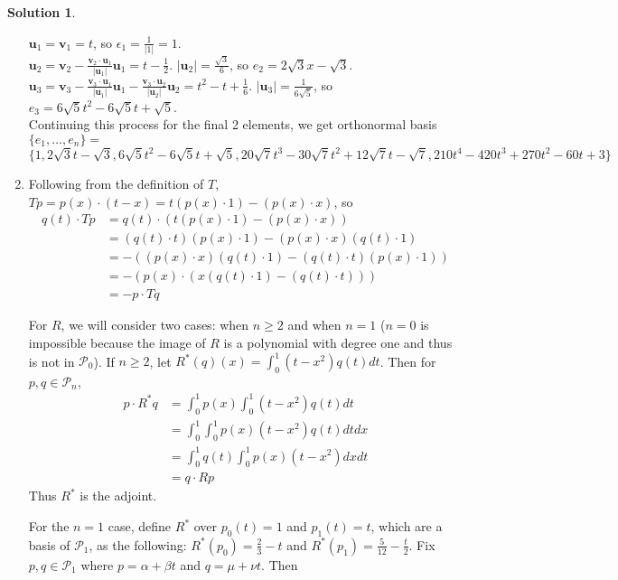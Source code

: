 \documentclass[11pt]{article}
\theoremstyle{definition}
\newtheorem*{solution}{Solution}
\newcommand{\e}{\epsilon}
\newcommand{\vv}{\mathbf{v}}
\newcommand{\vu}{\mathbf{u}}
\newcommand{\poly}{\mathcal{P}}
\begin{document}
\begin{solution}
\begin{enumerate}[label = \alph*)]
            $\vu_1 = \vv_1 = t$, so $\e_1 = \frac{1}{|1|} = 1$.\\$\vu_2 = \vv_2 - \frac{\vv_2 \cdot \vu_1}{|\vu_1|} \vu_1 = t - \frac{1}{2}$. $|\vu_2| = \frac{\sqrt{3}}{6}$, so $e_2 = 2\sqrt{3}x - \sqrt{3}$.\\$\vu_3 = \vv_3 - \frac{\vv_3\cdot \vu_1}{|\vu_1|}\vu_1 - \frac{\vv_3 \cdot \vu_2}{|\vu_2|}\vu_2 = t^2-t + \frac{1}{6}$. $|\vu_3| = \frac{1}{6\sqrt{5}}$, so $e_3 = 6\sqrt{5}t^2 - 6\sqrt{5}t + \sqrt{5}$.\\Continuing this process for the final 2 elements, we get orthonormal basis $\{e_1, \dots, e_n\} = $ 
            $$\{1, 2\sqrt{3}t - \sqrt{3}, 6\sqrt{5}t^2 - 6\sqrt{5}t + \sqrt{5}, 20\sqrt{7}t^3 - 30\sqrt{7}t^2 + 12\sqrt{7}t - \sqrt{7},210t^4-420t^3+270t^2-60t + 3\}$$
            \item Following from the definition of $T$, $Tp = p(x) \cdot (t-x) = t(p(x)\cdot 1) - (p(x) \cdot x)$, so 
            \begin{align*}
                q(t) \cdot Tp &= q(t) \cdot (t(p(x)\cdot 1) - (p(x) \cdot x))\\
                &= (q(t) \cdot t)(p(x) \cdot 1) - (p(x) \cdot x)(q(t) \cdot 1)\\
                &= -((p(x) \cdot x)(q(t) \cdot 1) - (q(t) \cdot t)(p(x) \cdot 1))\\
                &= -(p(x) \cdot (x(q(t) \cdot 1) - (q(t) \cdot t)))\\
                &= -p \cdot Tq
            \end{align*}

            For $R$, we will consider two cases: when $n \ge 2$ and when $n = 1$ ($n = 0$ is impossible because the image of $R$ is a polynomial with degree one and thus is not in $\poly_0$). If $n \ge 2$, let $R^*(q)(x) = \int_0^1 (t-x^2)q(t)dt$. Then for $p, q \in \poly_n$, 
            \begin{align*}
                p \cdot R^*q &= \int_0^1 p(x) \int_0^1 (t-x^2)q(t)dt \\
                &= \int_0^1 \int_0^1 p(x)(t-x^2)q(t)dt dx\\
                &= \int_0^1 q(t) \int_0^1 p(x)(t-x^2)dxdt\\
                &= q \cdot Rp
            \end{align*}
            Thus $R^*$ is the adjoint. 

            For the $n = 1$ case, define $R^*$ over $p_0(t) = 1$ and $p_1(t)=t$, which are a basis of $\poly_1$, as the following: $R^*(p_0) = \frac{2}{3}-t$ and $R^*(p_1) = \frac{5}{12} - \frac{t}{2}$. Fix $p, q \in \poly_1$ where $p = \alpha + \beta t$ and $q = \mu + \nu t$. Then 
            

\end{enumerate}
\end{solution}
\end{document}
